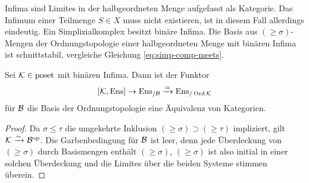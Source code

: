 Infima sind Limites in der halbgeordneten Menge aufgefasst als
Kategorie. Das Infimum einer Teilmenge $S \in X$ muss nicht
existieren, ist in diesem Fall allerdings eindeutig. Ein
Simplizialkomplex besitzt binäre Infima. Die Basis aus $(\geq
\sigma)$-Mengen der Ordnungstopologie einer halbgeordneten Menge mit
binären Infima ist schnittstabil, vergleiche Gleichung
\ref{eq:simp-comp-meets}.
\begin{satz} \label{sheaf-order-top}
  Sei $\mathcal{K} \in \operatorname{poset}$ mit binären Infima. Dann ist der Funktor
  \[
  [\mathcal{K}, \operatorname{Ens}] \to \operatorname{Ens_{/\mathcal{B}}} \xrightarrow{\approx} \operatorname{Ens}_{/\operatorname{Ord} \mathcal{K}}
  \]
  für $\mathcal{B}$ die Basis der Ordnungstopologie eine Äquivalenz von
  Kategorien.
\end{satz}
\begin{proof}
   Da $\sigma \leq \tau$ die umgekehrte Inklusion $(\geq \sigma)
   \supset (\geq \tau)$ impliziert, gilt $\mathcal{K} \xrightarrow[]{\sim} \mathcal{B}^\mathrm{op}$. Die
   Garbenbedingung für $\mathcal{B}$ ist leer, denn jede Überdeckung von $(\geq
   \sigma)$ durch Basismengen enthält $(\geq \sigma)$, $(\geq \sigma)$
   ist also initial in einer solchen Überdeckung und die Limites über
   die beiden Systeme stimmen überein.
\end{proof}
